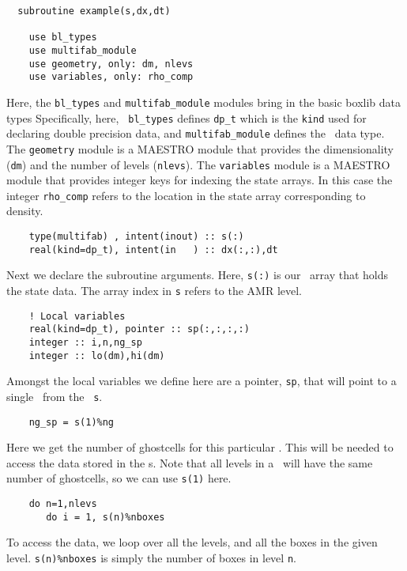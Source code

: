 \begin{verbatim}
  subroutine example(s,dx,dt)

    use bl_types
    use multifab_module
    use geometry, only: dm, nlevs
    use variables, only: rho_comp
\end{verbatim}

\noindent Here, the {\tt bl\_types} and {\tt multifab\_module} modules
bring in the basic boxlib data types Specifically, here, {\tt
bl\_types} defines {\tt dp\_t} which is the {\tt kind} used for
declaring double precision data, and {\tt multifab\_module} defines
the \multifab\ data type.  The {\tt geometry} module is a MAESTRO
module that provides the dimensionality ({\tt dm}) and the number of 
levels ({\tt nlevs}).  The {\tt variables} module is a MAESTRO
module that provides integer keys for indexing the state arrays.  In
this case the integer {\tt rho\_comp} refers to the location in the
state array corresponding to density.

\begin{verbatim}
    type(multifab) , intent(inout) :: s(:)
    real(kind=dp_t), intent(in   ) :: dx(:,:),dt
\end{verbatim}

\noindent Next we declare the subroutine arguments.  Here, {\tt s(:)}
is our \multifab\ array that holds the state data.  The array index
in {\tt s} refers to the AMR level.

\begin{verbatim}
    ! Local variables
    real(kind=dp_t), pointer :: sp(:,:,:,:)
    integer :: i,n,ng_sp
    integer :: lo(dm),hi(dm)
\end{verbatim}

\noindent Amongst the local variables we define here are a pointer,
{\tt sp}, that will point to a single \fab\ from the
\multifab\ {\tt s}.

\begin{verbatim}
    ng_sp = s(1)%ng
\end{verbatim}

\noindent Here we get the number of ghostcells for this particular
\multifab.  This will be needed to access the data stored in the
\fab s.  Note that all levels in a \multifab\ will have the same
number of ghostcells, so we can use {\tt s(1)} here.

\begin{verbatim}
    do n=1,nlevs
       do i = 1, s(n)%nboxes
\end{verbatim}

\noindent To access the data, we loop over all the levels, and
all the boxes in the given level.  {\tt s(n)\%nboxes} is simply
the number of boxes in level {\tt n}.


